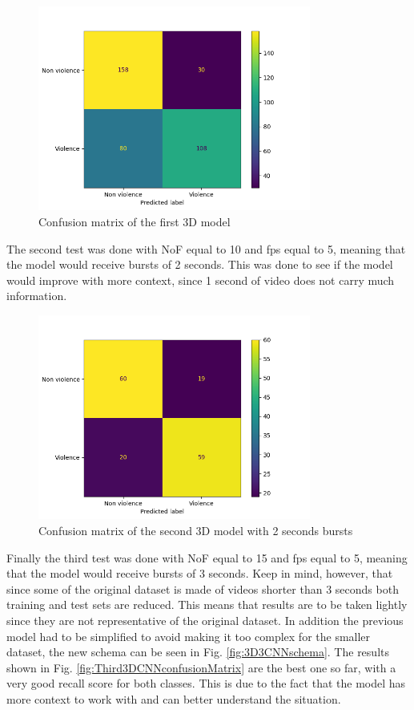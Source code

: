 \begin{figure}[]
    \centering
    \includegraphics[width=0.8\textwidth]{images/7f2d-testGiacomo3D9-9fcf-conf_matrix.png}
    \caption{Confusion matrix of the first 3D model}
    \label{fig:First3DCNNconfusionMatrix}
\end{figure}

The second test was done with NoF equal to 10 and fps equal to 5, meaning that the model would receive bursts of 2 seconds. This was done to see if the model would improve with more context, since 1 second of video does not carry much information. 

\begin{figure}[]
    \centering
    \includegraphics[width=0.8\textwidth]{images/ce07-testGiacomo3D3-9fcf-conf_matrix.png}
    \caption{Confusion matrix of the second 3D model with 2 seconds bursts}
    \label{fig:Second3DCNNconfusionMatrix}
\end{figure}

Finally the third test was done with NoF equal to 15 and fps equal to 5, meaning that the model would receive bursts of 3 seconds. Keep in mind, however, that since some of the original dataset is made of videos shorter than 3 seconds both training and test sets are reduced. This means that results are to be taken lightly since they are not representative of the original dataset. In addition the previous model had to be simplified to avoid making it too complex for the smaller dataset, the new schema can be seen in Fig. \ref{fig:3D3CNNschema}. The results shown in Fig. \ref{fig:Third3DCNNconfusionMatrix} are the best one so far, with a very good recall score for both classes. This is due to the fact that the model has more context to work with and can better understand the situation.

